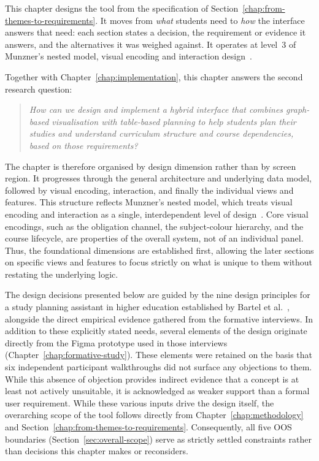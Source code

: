 \label{chap:design}
This chapter designs the tool from the specification of Section~\ref{chap:from-themes-to-requirements}. It moves from \emph{what} students need to \emph{how} the interface answers that need: each section states a decision, the requirement or evidence it answers, and the alternatives it was weighed against. It operates at level~3 of Munzner's nested model, visual encoding and interaction design~\cite{munzner2009}.

Together with Chapter~\ref{chap:implementation}, this chapter answers the second research question:

\begin{quote}
\textit{How can we design and implement a hybrid interface that combines graph-based visualisation with table-based planning to help students plan their studies and understand curriculum structure and course dependencies, based on those requirements?}
\end{quote}

The chapter is therefore organised by design dimension rather than by screen region. It progresses through the general architecture and underlying data model, followed by visual encoding, interaction, and finally the individual views and features. This structure reflects Munzner's nested model, which treats visual encoding and interaction as a single, interdependent level of design~\cite[p.~922]{munzner2009}.
Core visual encodings, such as the obligation channel, the subject-colour hierarchy, and the course lifecycle, are properties of the overall system, not of an individual panel. Thus, the foundational dimensions are established first, allowing the later sections on specific views and features to focus strictly on what is unique to them without restating the underlying logic.

The design decisions presented below are guided by the nine design principles for a study planning assistant in higher education established by Bartel et al.~\cite{bartel_design_2024}, alongside the direct empirical evidence gathered from the formative interviews. In addition to these explicitly stated needs, several elements of the design originate directly from the Figma prototype used in those interviews (Chapter~\ref{chap:formative-study}). These elements were retained on the basis that six independent participant walkthroughs did not surface any objections to them. While this absence of objection provides indirect evidence that a concept is at least not actively unsuitable, it is acknowledged as weaker support than a formal user requirement. While these various inputs drive the design itself, the overarching scope of the tool follows directly from Chapter~\ref{chap:methodology} and Section~\ref{chap:from-themes-to-requirements}. Consequently, all five OOS boundaries (Section~\ref{sec:overall-scope}) serve as strictly settled constraints rather than decisions this chapter makes or reconsiders.

